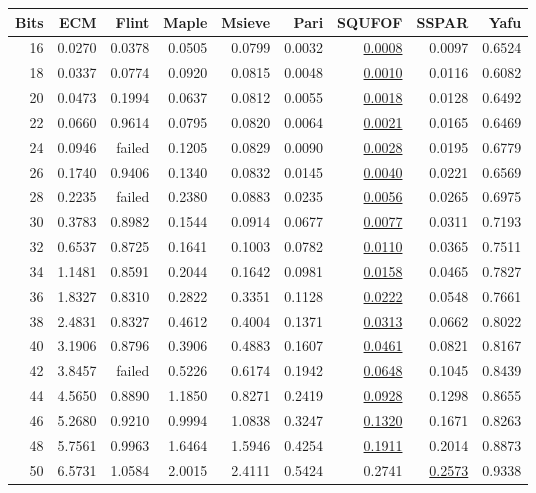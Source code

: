 \documentclass{ucalgthes1}
\theoremstyle{definition}
\begin{document}
\begin{table}[htb]
\centering
\begin{tabular}{| r | r | r | r | r | r | r | r | r |}
	\hline
Bits & ECM & Flint & Maple & Msieve & Pari & SQUFOF & SSPAR & Yafu \\
	\hline
16 & 0.0270 & 0.0378 & 0.0505 & 0.0799 & 0.0032 & \underline{0.0008} & 0.0097 & 0.6524 \\
18 & 0.0337 & 0.0774 & 0.0920 & 0.0815 & 0.0048 & \underline{0.0010} & 0.0116 & 0.6082 \\
20 & 0.0473 & 0.1994 & 0.0637 & 0.0812 & 0.0055 & \underline{0.0018} & 0.0128 & 0.6492 \\
22 & 0.0660 & 0.9614 & 0.0795 & 0.0820 & 0.0064 & \underline{0.0021} & 0.0165 & 0.6469 \\
24 & 0.0946 & failed & 0.1205 & 0.0829 & 0.0090 & \underline{0.0028} & 0.0195 & 0.6779 \\
26 & 0.1740 & 0.9406 & 0.1340 & 0.0832 & 0.0145 & \underline{0.0040} & 0.0221 & 0.6569 \\
28 & 0.2235 & failed & 0.2380 & 0.0883 & 0.0235 & \underline{0.0056} & 0.0265 & 0.6975 \\
30 & 0.3783 & 0.8982 & 0.1544 & 0.0914 & 0.0677 & \underline{0.0077} & 0.0311 & 0.7193 \\
32 & 0.6537 & 0.8725 & 0.1641 & 0.1003 & 0.0782 & \underline{0.0110} & 0.0365 & 0.7511 \\
34 & 1.1481 & 0.8591 & 0.2044 & 0.1642 & 0.0981 & \underline{0.0158} & 0.0465 & 0.7827 \\
36 & 1.8327 & 0.8310 & 0.2822 & 0.3351 & 0.1128 & \underline{0.0222} & 0.0548 & 0.7661 \\
38 & 2.4831 & 0.8327 & 0.4612 & 0.4004 & 0.1371 & \underline{0.0313} & 0.0662 & 0.8022 \\
40 & 3.1906 & 0.8796 & 0.3906 & 0.4883 & 0.1607 & \underline{0.0461} & 0.0821 & 0.8167 \\
42 & 3.8457 & failed & 0.5226 & 0.6174 & 0.1942 & \underline{0.0648} & 0.1045 & 0.8439 \\
44 & 4.5650 & 0.8890 & 1.1850 & 0.8271 & 0.2419 & \underline{0.0928} & 0.1298 & 0.8655 \\
46 & 5.2680 & 0.9210 & 0.9994 & 1.0838 & 0.3247 & \underline{0.1320} & 0.1671 & 0.8263 \\
48 & 5.7561 & 0.9963 & 1.6464 & 1.5946 & 0.4254 & \underline{0.1911} & 0.2014 & 0.8873 \\
50 & 6.5731 & 1.0584 & 2.0015 & 2.4111 & 0.5424 & 0.2741 & \underline{0.2573} & 0.9338 \\

\end{tabular}
\end{table}
\end{document}

